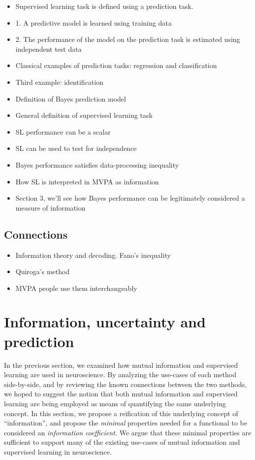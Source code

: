 \documentclass[12pt]{article}
\begin{document}
\begin{itemize}
\item Supervised learning task is defined using a prediction task.
\item 1. A predictive model is learned using training data
\item 2. The performance of the model on the prediction task is estimated using independent test data
\item Classical examples of prediction tasks: regression and classification
\item Third example: identification
\item Definition of Bayes prediction model
\item General definition of supervised learning task
\item SL performance can be a scalar
\item SL can be used to test for independence
\item Bayes performance satisfies data-processing inequality
\item How SL is interpreted in MVPA as information
\item Section 3, we'll see how Bayes performance can be legitimately considered a measure of information
\end{itemize}

\subsection{Connections}

\begin{itemize}
\item Information theory and decoding. Fano's inequality
\item Quiroga's method
\item MVPA people use them interchangeably
\end{itemize}

\section{Information, uncertainty and prediction}\label{sec:gen_class}

In the previous section, we examined how mutual information and
supervised learning are used in neuroscience.  By analyzing the
use-cases of each method side-by-side, and by reviewing the known
connections between the two methods, we hoped to suggest the notion
that both mutual information and supervised learning are being
employed as means of quantifying the same underlying concept.  In this
section, we propose a reification of this underlying concept of
``information'', and propose the \emph{minimal} properties needed for
a functional to be considered an \emph{information coefficient.}  We
argue that these minimal properties are sufficient to support many of
the existing use-cases of mutual information and supervised learning
in neuroscience.
\end{document}
